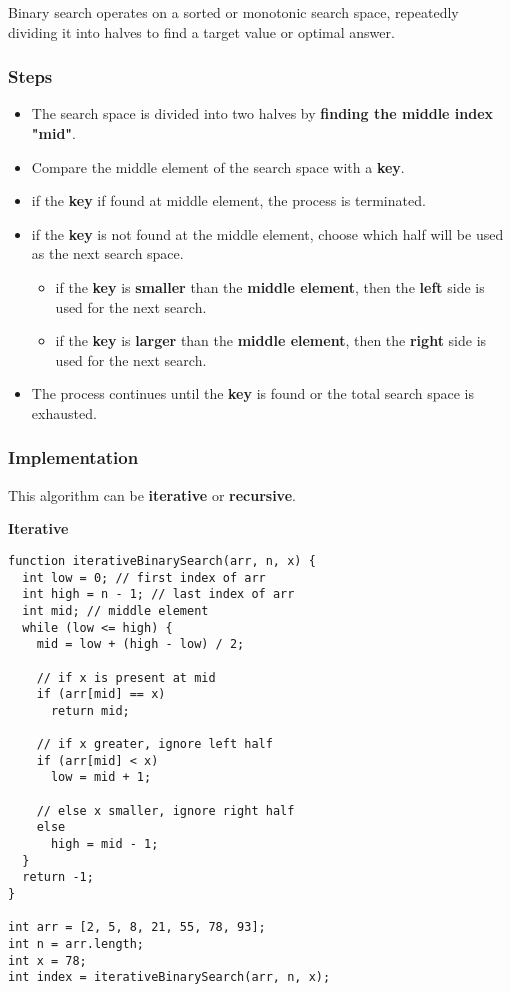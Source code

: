 Binary search operates on a sorted or monotonic search space, repeatedly dividing it into halves to find a target value or optimal answer.

\subsubsection*{Steps}

\begin{itemize}
  \item The search space is divided into two halves by \textbf{finding the middle index "mid"}.
  \item Compare the middle element of the search space with a \textbf{key}.
  \item if the \textbf{key} if found at middle element, the process is terminated.
  \item if the \textbf{key}  is not found at the middle element, choose which half will be used as the next search space.
  \begin{itemize}
    \item if the \textbf{key} is \textbf{smaller} than the \textbf{middle element}, then the \textbf{left} side is used for the next search.
    \item if the \textbf{key} is \textbf{larger} than the \textbf{middle element}, then the \textbf{right} side is used for the next search.
  \end{itemize}
  \item The process continues until the \textbf{key} is found or the total search space is exhausted.
\end{itemize}

\subsubsection*{Implementation}

This algorithm can be \textbf{iterative} or \textbf{recursive}.

\textbf{Iterative}

\begin{lstlisting}[style=general]
function iterativeBinarySearch(arr, n, x) {
  int low = 0; // first index of arr
  int high = n - 1; // last index of arr
  int mid; // middle element
  while (low <= high) {
    mid = low + (high - low) / 2;

    // if x is present at mid
    if (arr[mid] == x)
      return mid;

    // if x greater, ignore left half
    if (arr[mid] < x)
      low = mid + 1;

    // else x smaller, ignore right half
    else
      high = mid - 1;
  }
  return -1;
}

int arr = [2, 5, 8, 21, 55, 78, 93];
int n = arr.length;
int x = 78;
int index = iterativeBinarySearch(arr, n, x);
\end{lstlisting}

